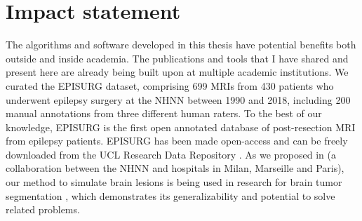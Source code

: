 \chapter{Impact statement}

The algorithms and software developed in this thesis have potential benefits both outside and inside academia.
The publications and tools that I have shared and present here are already being built upon at multiple academic institutions.
We curated the EPISURG dataset, comprising 699 \acp{MRI} from 430 patients who underwent epilepsy surgery at the \ac{NHNN} between 1990 and 2018, including 200 manual annotations from three different human raters.
To the best of our knowledge, EPISURG is the first open annotated database of post-resection \ac{MRI} from epilepsy patients.
EPISURG has been made open-access and can be freely downloaded from the UCL Research Data Repository \cite{perez-garcia_episurg_2020}.
As we proposed in \cite{perez-garcia_self-supervised_2021} (a collaboration between the \ac{NHNN} and hospitals in Milan, Marseille and Paris), our method to simulate brain lesions is being used in research for brain tumor segmentation \cite{zhang_self-supervised_2021}, which demonstrates its generalizability and potential to solve related problems.

